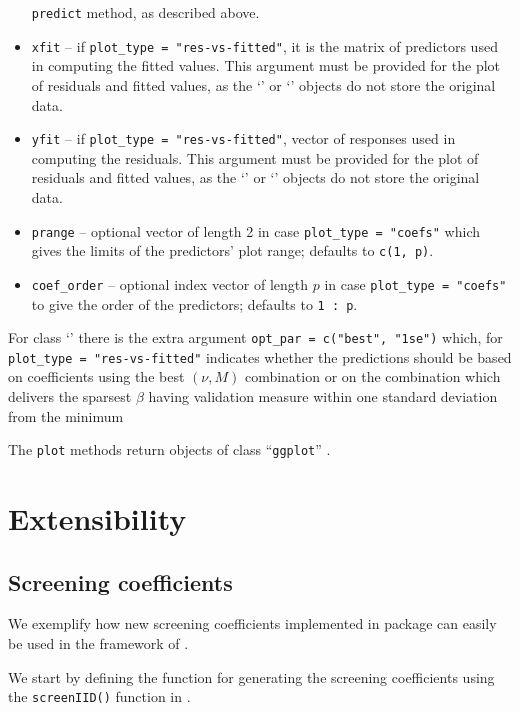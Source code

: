 \documentclass[
  article]{jss}
\newcommand{\class}[1]{`\code{#1}'}
\begin{document}
\begin{itemize}
  \texttt{predict} method, as described above.
\item
  \texttt{xfit} -- if \texttt{plot\_type\ =\ "res-vs-fitted"}, it is the
  matrix of predictors used in computing the fitted values. This
  argument must be provided for the plot of residuals and fitted values,
  as the \class{spar} or \class{spar.cv} objects do not store the
  original data.
\item
  \texttt{yfit} -- if \texttt{plot\_type\ =\ "res-vs-fitted"}, vector of
  responses used in computing the residuals. This argument must be
  provided for the plot of residuals and fitted values, as the
  \class{spar} or \class{spar.cv} objects do not store the original
  data.
\item
  \texttt{prange} -- optional vector of length 2 in case
  \texttt{plot\_type\ =\ "coefs"} which gives the limits of the
  predictors' plot range; defaults to \texttt{c(1,\ p)}.
\item
  \texttt{coef\_order} -- optional index vector of length \(p\) in case
  \texttt{plot\_type\ =\ "coefs"} to give the order of the predictors;
  defaults to \texttt{1\ :\ p}.
\end{itemize}

For class \class{spar.cv} there is the extra argument
\texttt{opt\_par\ =\ c("best",\ "1se")} which, for
\texttt{plot\_type\ =\ "res-vs-fitted"} indicates whether the
predictions should be based on coefficients using the best \((\nu, M)\)
combination or on the combination which delivers the sparsest \(\beta\)
having validation measure within one standard deviation from the minimum

The \texttt{plot} methods return objects of class ``\texttt{ggplot}''
\citep{ggplotR}.

\section{Extensibility}\label{sec-extensibility}

\subsection{Screening coefficients}\label{sec-extensscrcoef}

We exemplify how new screening coefficients implemented in package
 can easily be used in the framework of
.

We start by defining the function for generating the screening
coefficients using the \texttt{screenIID()} function in
.
\end{document}
